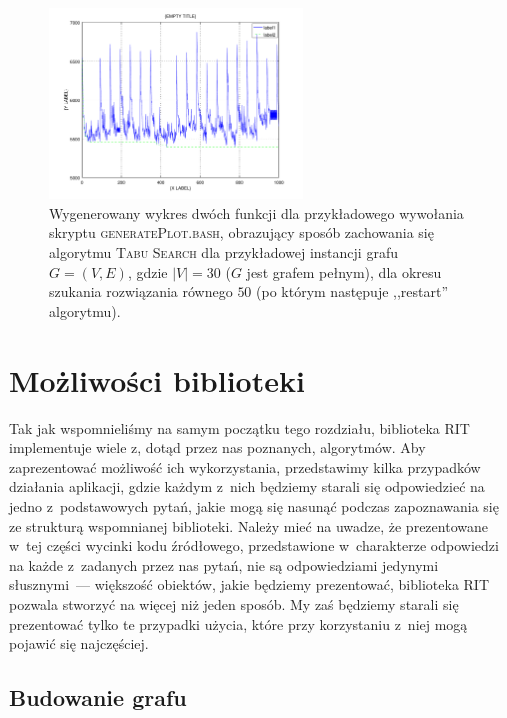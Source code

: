 \begin{figure}[!htbp]
	\renewcommand\figurename{Wykres}
	\null\hfill
	\includegraphics[width=0.6\textwidth]{Appendix_I/GENERATE-PLOT-example/1}
	\hfill\null
	\caption{
		Wygenerowany wykres dwóch funkcji dla przykładowego wywołania skryptu \textsc{generatePlot.bash}, obrazujący sposób zachowania się algorytmu \textsc{Tabu Search} dla przykładowej instancji grafu $G = \left( V, E \right)$, gdzie $\left| V \right| = 30$ ($G$ jest grafem pełnym), dla okresu szukania rozwiązania równego $50$ (po którym następuje ,,restart'' algorytmu).
	}
	\label{fig:genplot}
\end{figure}




\section{Możliwości biblioteki}




Tak jak wspomnieliśmy na samym początku tego rozdziału, biblioteka \textsc{RIT} implementuje wiele z, dotąd przez nas poznanych, algorytmów.
Aby zaprezentować możliwość ich wykorzystania, przedstawimy kilka przypadków działania aplikacji, gdzie każdym z~nich będziemy starali się odpowiedzieć na jedno z~podstawowych pytań, jakie mogą się nasunąć podczas zapoznawania się ze strukturą wspomnianej biblioteki. 
Należy mieć na uwadze, że prezentowane w~tej części wycinki kodu źródłowego, przedstawione w~charakterze odpowiedzi na każde z~zadanych przez nas pytań, nie są odpowiedziami jedynymi słusznymi~--- większość obiektów, jakie będziemy prezentować, biblioteka \textsc{RIT} pozwala stworzyć na więcej niż jeden sposób.
My zaś będziemy starali się prezentować tylko te przypadki użycia, które przy korzystaniu z~niej mogą pojawić się najczęściej.



\subsection{Budowanie grafu}



